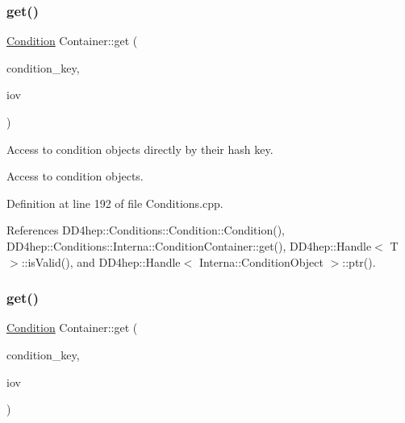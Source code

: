 \subsubsection{\texorpdfstring{get()}{get()}\hspace{0.1cm}{\footnotesize\ttfamily [2/4]}}
{\footnotesize\ttfamily \hyperlink{class_d_d4hep_1_1_conditions_1_1_condition}{Condition} Container\+::get (\begin{DoxyParamCaption}\item[{\hyperlink{class_d_d4hep_1_1_conditions_1_1_container_a65e62d9e4a43b9b0e9e46a7b80876a21}{key\+\_\+type}}]{condition\+\_\+key,  }\item[{const \hyperlink{class_d_d4hep_1_1_conditions_1_1_container_a169b09fd183c9e05faf63429bad6c668}{iov\+\_\+type} \&}]{iov }\end{DoxyParamCaption})}



Access to condition objects directly by their hash key. 

Access to condition objects. 

Definition at line 192 of file Conditions.\+cpp.



References D\+D4hep\+::\+Conditions\+::\+Condition\+::\+Condition(), D\+D4hep\+::\+Conditions\+::\+Interna\+::\+Condition\+Container\+::get(), D\+D4hep\+::\+Handle$<$ T $>$\+::is\+Valid(), and D\+D4hep\+::\+Handle$<$ Interna\+::\+Condition\+Object $>$\+::ptr().

\hypertarget{class_d_d4hep_1_1_conditions_1_1_container_a03d964c9a3b0737564b3a28bb9e8ad03}{}\label{class_d_d4hep_1_1_conditions_1_1_container_a03d964c9a3b0737564b3a28bb9e8ad03} 
\subsubsection{\texorpdfstring{get()}{get()}\hspace{0.1cm}{\footnotesize\ttfamily [3/4]}}
{\footnotesize\ttfamily \hyperlink{class_d_d4hep_1_1_conditions_1_1_condition}{Condition} Container\+::get (\begin{DoxyParamCaption}\item[{const std\+::string \&}]{condition\+\_\+key,  }\item[{const \hyperlink{class_d_d4hep_1_1_conditions_1_1_user_pool}{User\+Pool} \&}]{iov }\end{DoxyParamCaption})}



